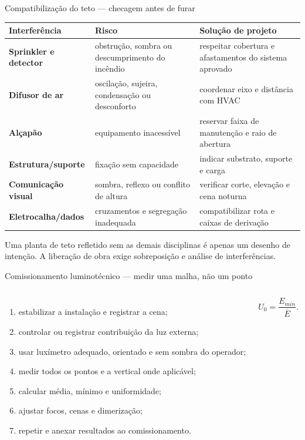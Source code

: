 \begin{frame}{Compatibilização do teto — checagem antes de furar}
\scriptsize
\begin{tabularx}{\textwidth}{>{\bfseries}p{3.0cm}X X}
\toprule
Interferência & Risco & Solução de projeto \\
\midrule
Sprinkler e detector & obstrução, sombra ou descumprimento do incêndio & respeitar cobertura e afastamentos do sistema aprovado \\
Difusor de ar & oscilação, sujeira, condensação ou desconforto & coordenar eixo e distância com HVAC \\
Alçapão & equipamento inacessível & reservar faixa de manutenção e raio de abertura \\
Estrutura/suporte & fixação sem capacidade & indicar substrato, suporte e carga \\
Comunicação visual & sombra, reflexo ou conflito de altura & verificar corte, elevação e cena noturna \\
Eletrocalha/dados & cruzamentos e segregação inadequada & compatibilizar rota e caixas de derivação \\
\bottomrule
\end{tabularx}
\begin{caixaAt}
Uma planta de teto refletido sem as demais disciplinas é apenas um desenho de intenção. A liberação de obra exige sobreposição e análise de interferências.
\end{caixaAt}
\end{frame}

\begin{frame}{Comissionamento luminotécnico — medir uma malha, não um ponto}
\small
\begin{columns}[T,onlytextwidth]
\begin{enumerate}
\item estabilizar a instalação e registrar a cena;
\item controlar ou registrar contribuição da luz externa;
\item usar luxímetro adequado, orientado e sem sombra do operador;
\item medir todos os pontos e a vertical onde aplicável;
\item calcular média, mínimo e uniformidade;
\item ajustar focos, cenas e dimerização;
\item repetir e anexar resultados ao comissionamento.
\end{enumerate}
\[
U_0=\frac{E_{min}}{\overline{E}}.
\]
\end{columns}
\end{frame}

